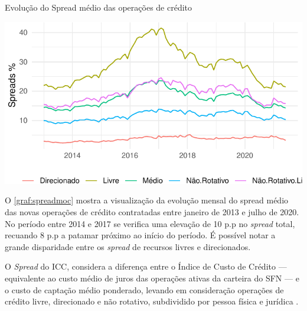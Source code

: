 \documentclass[
  12pt,
  12pt,
  openright,
  oneside,
  a4paper,
  chapter=TITLE,
  section=TITLE,
  subsection=TITLE,
  subsubsection=TITLE,
  portugues,
  sumario=tradicional]{abntex2}
\begin{document}
\begin{grafico}[!htbp]
\vspace{20pt}
\caption{Evolução do Spread médio das operações de crédito}
\vspace{-4mm}

\begin{center}\includegraphics{12-exportedfigures/spread.2019.moc-1} \end{center}
\vspace{-3mm}
\label{graf:spreadmoc}
\vspace{-2mm}
\end{grafico}

O \autoref{graf:spreadmoc} mostra a visualização da evolução mensal do spread médio das novas operações de crédito contratadas entre janeiro de 2013 e julho de 2020. No período entre 2014 e 2017 se verifica uma elevação de 10 p.p no \emph{spread} total, recuando 8 p.p a patamar próximo ao início do período. É possível notar a grande disparidade entre os \emph{spread} de recursos livres e direcionados.

O \emph{Spread} do ICC, considera a diferença entre o Índice de Custo de Crédito --- equivalente ao custo médio de juros das operações ativas da carteira do SFN --- e o custo de captação médio ponderado, levando em consideração operações de crédito livre, direcionado e não rotativo, subdividido por pessoa física e jurídica \cite{BCB:2016}.
\end{document}
